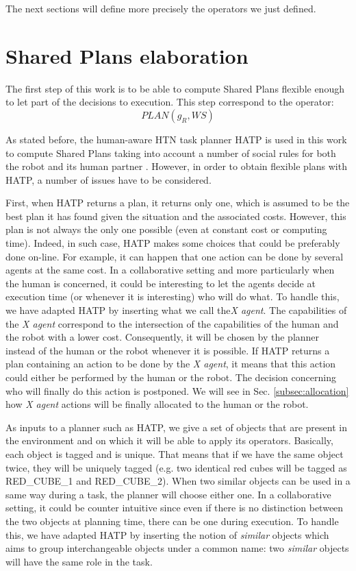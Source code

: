 \documentclass[english,a4paper,11pt,twoside]{StyleThese}
\begin{document}
The next sections will define more precisely the operators we just defined.


\section{Shared Plans elaboration}

The first step of this work is to be able to compute Shared Plans flexible enough to let part of the decisions to execution. This step correspond to the operator:
$$PLAN(g_R, WS)$$

As stated before, the human-aware HTN task planner HATP is used in this work to compute Shared Plans taking into account a number of social rules for both the robot and its human partner \cite{Lallement2014hatp}. However, in order to obtain flexible plans with HATP, a number of issues have to be considered.

First, when HATP returns a plan, it returns only one, which is assumed to be the best plan it has found given the situation and the associated costs. However, this plan is not always the only one possible (even at constant cost or computing time). Indeed, in such case, HATP makes some choices that could be preferably done on-line. For example, it can happen that one action can be done by several agents at the same cost. In a collaborative setting and more particularly when the human is concerned, it could be interesting to let the agents decide at execution time (or whenever it is interesting) who will do what. To handle this, we have adapted HATP by inserting what we call the\textit{X agent}. The capabilities of the \textit{X agent} correspond to the intersection of the capabilities of the human and the robot with a lower cost. Consequently, it will be chosen by the planner instead of the human or the robot whenever it is possible. If HATP returns a plan containing an action to be done by the \textit{X agent}, it means that this action could either be performed by the human or the robot. The decision concerning who will finally do this action is postponed. We will see in Sec. \ref{subsec:allocation} how \textit{X agent} actions will be finally allocated to the human or the robot.

As inputs to a planner such as HATP, we give a set of objects that are present in the environment and on which it will be able to apply its operators. Basically, each object is tagged and is unique. That means that if we have the same object twice, they will be uniquely tagged (e.g. two identical red cubes will be tagged as RED\_CUBE\_1 and RED\_CUBE\_2). When two similar objects can be used in a same way during a task, the planner will choose either one. In a collaborative setting, it could be counter intuitive since even if there is no distinction between the two objects at planning time, there can be one during execution. To handle this, we have adapted HATP by inserting the notion of \textit{similar} objects which aims to group interchangeable objects under a common name: two \textit{similar} objects will have the same role in the task. 
\end{document}
